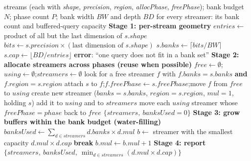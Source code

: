\documentclass{cernatsnote}
\begin{document}
\begin{algorithm}[H] 
\caption{DFX streamer buffer allocation}
\label{alg:magic_streamer}
\begin{algorithmic}[1]
\Require streams (each with \emph{shape}, \emph{precision}, \emph{region}, \emph{allocPhase}, \emph{freePhase}); bank budget $N$; phase count $P$; bank width $BW$ and depth $BD$
\Ensure for every streamer: its bank count and buffered-query capacity
\Statex
\State \textbf{Stage 1: per-stream geometry}
    \State $entries \gets$ product of all but the last dimension of $s.shape$ 
    \State $bits \gets s.precision \times (\text{last dimension of } s.shape)$
    \State $s.banks \gets \lceil bits / BW \rceil$ 
    \State $s.cap \gets \lfloor BD / entries \rfloor$ 
        \State \textbf{error}: ``one query does not fit in a bank set''
    \EndIf
\EndFor
\Statex
\State \textbf{Stage 2: allocate streamers across phases (reuse when possible)}
\State $free \gets \emptyset$;\quad $using \gets \emptyset$;\quad $streamers \gets \emptyset$
        \State look for a free streamer $f$ with $f.banks = s.banks$ \textbf{and} $f.region = s.region$
            \State attach $s$ to $f$;\quad $f.freePhase \gets s.freePhase$;\quad move $f$ from $free$ to $using$
        \Else
            \State create new streamer ($banks = s.banks$, $region = s.region$, $mul = 1$, holding $s$)
            \State add it to $using$ and to $streamers$
        \EndIf
    \EndFor
    \State move each $using$ streamer whose $freePhase = phase$ back to $free$ 
\EndFor
{}
    \State \Return $\{streamers,\ banksUsed = 0\}$
\EndIf
\Statex
\State \textbf{Stage 3: grow buffers within the bank budget (water-filling)}
    \State $banksUsed \gets \sum_{d \in streamers} d.banks \times d.mul$
    \State $b \gets$ streamer with the smallest capacity $d.mul \times d.cap$ 
        \State \textbf{break} 
    \EndIf
    \State $b.mul \gets b.mul + 1$ 
\EndWhile
\Statex
\State \textbf{Stage 4: report}
\State \Return $\{streamers,\ banksUsed,\ \min_{d \in streamers}(d.mul \times d.cap)\}$
\end{algorithmic}
\end{algorithm}
\end{document}
